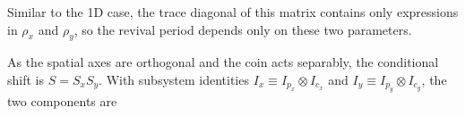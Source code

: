 Similar to the 1D case, the trace diagonal of this matrix contains only
expressions in $\rho_x$ and $\rho_y$, so the revival period depends
only on these two parameters.

As the spatial axes are orthogonal and the coin acts separably,
the conditional shift is $S = S_x S_y$. With subsystem identities
$I_x \equiv I_{p_x} \otimes I_{c_x}$ and
$I_y \equiv I_{p_y} \otimes I_{c_y}$, the two components are

